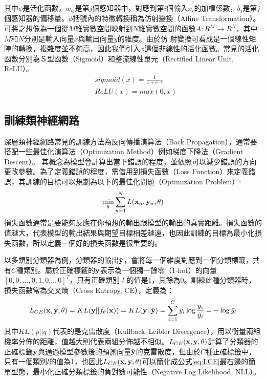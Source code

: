 其中$\phi$是活化函數，$w_{ij}$是第$j$個感知器中，對應到第$i$個輸入$x_i$的加權係數，$b_j$是第$j$個感知器的偏移量。$\phi$括號內的特徵轉換稱為仿射變換（Affine
Transformation）。可將之想像為一個從$M$維實數空間映射到$N$維實數空間的函數$A:
R^M \rightarrow R^N$，其中$M$和$N$分別是輸入向量$x$與輸出向量$y$的維度。由於仿
射變換可看成是一個線性矩陣的轉換，複雜度並不夠高，因此我們引入$\phi$這個非線性的活化函數。常見的活化函數分別為Ｓ型函數（Sigmoid）和整流線性單元（Rectified Linear Unit, ReLU）。
\begin{equation}
\begin{aligned}
&sigmoid(x) = \frac{1}{1 + e^{-x}}
\\
&ReLU(x) = max( 0 , x )
\end{aligned}
\end{equation}


\subsection{訓練類神經網路}
\label{ch2_train_DNN}
深層類神經網路常見的訓練方法為反向傳播演算法（Back
Propagation）\cite{rumelhart1988learning}，通常要搭配一些最佳化演算法（Optimization
Method）例如梯度下降法（Gradient Descent）。
其概念為模型會計算出當下錯誤的程度，並依照可以減少錯誤的方向更改參數。為了定義錯誤的程度，需借用到損失函數（Loss
Function）來定義錯誤，其訓練的目標可以規劃為以下的最佳化問題（Optimization
Problem）:
\begin{equation}
\min_{\theta}{ \sum_{n=1}^{N}{ {L( \bold{x}_n , \bold{y}_n ,\theta)}}}
\end{equation}
損失函數通常是要能夠反應在你預想的輸出跟模型的輸出的真實距離。損失函數的值越大，代表模型的輸出結果與期望目標相差越遠，也因此訓練的目標為最小化損失函數，所以定義一個好的損失函數是很重要的。

以多類別分類器為例，分類器的輸出$\hat{\bold{y}}$，會將每一個維度對應到一個分類標籤，共有$C$種類別。屬於正確標籤的$\bold{y}$表示為一個獨一餘零（1-hot）的向量$[0, 0 , ... , 0 , 1 , 0 ... , 0]^T $，只有正確類別 $l$ 的值是1，其餘為0。訓練此種分類器時，損失函數常為交叉熵（Cross Entropy, CE），定義為：
\begin{equation} 
\label{eq:LCE}
L_{CE}(\bold{x} , \bold{y} , \theta) = KL( \bold{y} || f_{\theta}(\bold{x}) ) = KL(\bold{y} || \hat{\bold{y} }) = \sum_{i = 1}^{C} y_i \log{ \frac{y_i}{\hat{y}_i} } = - \log \hat{y}_{l} 
\end{equation}
其中$KL(p||q)$代表的是克雷散度（Kullback–Leibler Divergence），用以衡量兩組機率分佈的距離，值越大則代表兩組分佈越不相似。$L_{CE}(\bold{x} , \bold{y} , \theta) $計算了分類器的正確標籤$\bold{y}$與通過模型參數後的預測向量$\hat{\bold{y}}$的克雷散度，但由於$C$種正確標籤中，只有一個類別$l$的值為1，也因此$L_{CE}(\bold{x} , \bold{y} , \theta) $可以簡化成公式\ref{eq:LCE}最右邊的簡單型態，最小化正確分類標籤的負對數可能性（Negative Log Likelihood, NLL）。

